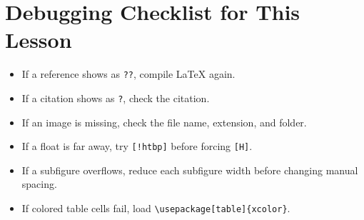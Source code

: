 \documentclass[11pt,a4paper]{article}
\begin{document}
\section{Debugging Checklist for This Lesson}

\begin{itemize}
    \item If a reference shows as \texttt{??}, compile LaTeX again.
    \item If a citation shows as \texttt{?}, check the citation.
    \item If an image is missing, check the file name, extension, and folder.
    \item If a float is far away, try \verb|[!htbp]| before forcing \verb|[H]|.
    \item If a subfigure overflows, reduce each subfigure width before changing
    manual spacing.
    \item If colored table cells fail, load \verb|\usepackage[table]{xcolor}|.
\end{itemize}



\end{document}
